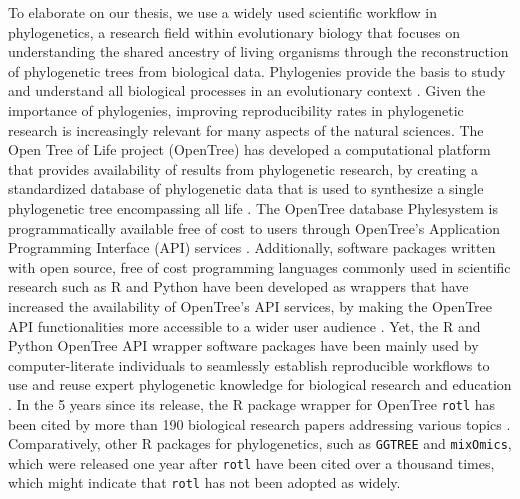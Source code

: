 \documentclass[12pt]{article}
\begin{document}
To elaborate on our thesis, we use a widely used scientific workflow in phylogenetics,
a research field within evolutionary biology that focuses
on understanding the shared ancestry of living organisms through the reconstruction of
phylogenetic trees from biological data. Phylogenies provide the
basis to study and understand all biological processes in an evolutionary context
\citep{dobzhansky1973nothing}.
Given the importance of phylogenies, improving reproducibility rates
in phylogenetic research is increasingly relevant for many aspects of the natural sciences.
The Open Tree of Life project (OpenTree) has developed a computational platform that provides
availability of results from phylogenetic research, by creating a standardized database of
phylogenetic data that is used to synthesize a single phylogenetic tree encompassing
all life \citep{opentreeoflife2019synth}.
The OpenTree database Phylesystem \citep{mctavish2015phylesystem} is programmatically
available free of cost to users through OpenTree's Application Programming Interface
(API) services \citep{opentreeAPIs}.
Additionally, software packages written with open source, free of cost programming
languages commonly used in scientific research such as R and Python
\citep{baker2017scientific} have been developed as wrappers that have increased the availability
of OpenTree's API services, by making the OpenTree API functionalities more accessible
to a wider user audience \citep{michonneau2016rotl, mctavish2021opentree}.
Yet, the R and Python OpenTree API wrapper software packages have been mainly used
by computer-literate individuals
to seamlessly establish reproducible workflows to use and reuse expert phylogenetic
knowledge for biological research \citep{sanchez2019datelife, sanchez2021physcraper}
and education \citep{nguyen2020phylotastic, phylotasticedtools, galacticedtools}.
In the 5 years since its release, the R package wrapper for OpenTree \texttt{rotl}
has been cited by more than 190 biological research papers addressing various
topics \citep{googlerotl}.
Comparatively, other R packages for phylogenetics, such as \texttt{GGTREE}
and \texttt{mixOmics}, which were released one year after \texttt{rotl} have been
cited over a thousand times, which might indicate that \texttt{rotl} has not been
adopted as widely.
\end{document}
